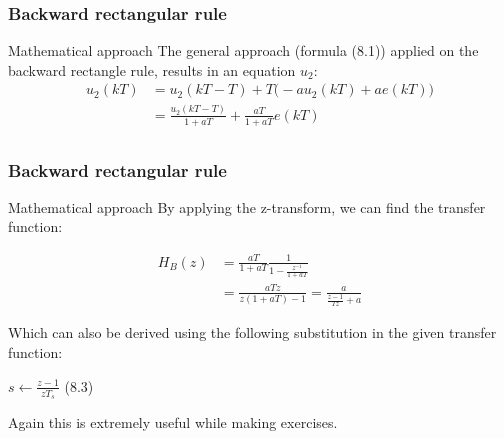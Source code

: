 \begin{frame}
	\frametitle{Backward rectangular rule}	
	\begin{block}{Mathematical approach}
		The general approach (formula (8.1)) applied on the backward rectangle rule, results in an equation $u_2$:
		\begin{align*}
		u_2(kT)& =u_2(kT - T) + T\big(-au_2(kT) + ae(kT) \big)\\
		&=\frac{u_2(kT - T)}{1 + aT} + \frac{aT}{1 + aT}e(kT)\\
		\end{align*}
	\end{block}
\end{frame}

\begin{frame}
	\frametitle{Backward rectangular rule}
	\begin{block}{Mathematical approach}
		By applying the z-transform, we can find the transfer function:
		\vspace{-2em}
		\begin{center}
			\begin{align*}
			H_B(z) &= \frac{aT}{1 + aT} \frac{1}{1 - \frac{z^{-1}}{1 + aT}}\\
			&= \frac{aTz}{z(1+aT) - 1} = \frac{a}{\frac{z-1}{Tz}+a}
			\end{align*}
		\end{center}
		Which can also be derived using the following substitution in the given transfer function:
		\begin{center}
			$s \gets \frac{z-1}{zT_s}$ (8.3)
		\end{center}
		Again this is extremely useful while making exercises.
	\end{block}
\end{frame}

